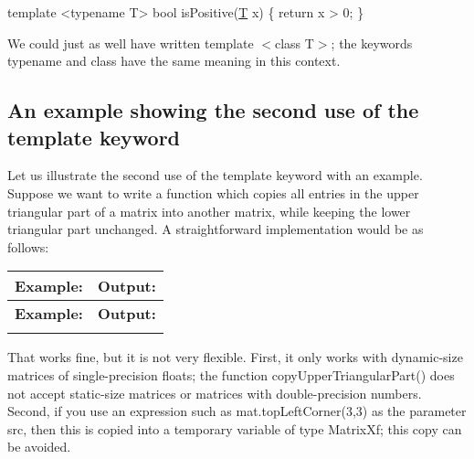 \begin{DoxyCode}
\textcolor{keyword}{template} <\textcolor{keyword}{typename} T>
\textcolor{keywordtype}{bool} isPositive(\hyperlink{group___sparse_core___module_class_eigen_1_1_triplet}{T} x)
\{
    \textcolor{keywordflow}{return} x > 0;
\}
\end{DoxyCode}


We could just as well have written {\ttfamily template $<$class T$>$}; the keywords {\ttfamily typename} and {\ttfamily class} have the same meaning in this context.\hypertarget{_topic_template_keyword_TopicTemplateKeywordExample}{}\subsection{An example showing the second use of the template keyword}\label{_topic_template_keyword_TopicTemplateKeywordExample}
Let us illustrate the second use of the {\ttfamily template} keyword with an example. Suppose we want to write a function which copies all entries in the upper triangular part of a matrix into another matrix, while keeping the lower triangular part unchanged. A straightforward implementation would be as follows\+:

\tabulinesep=1mm
\begin{longtabu} spread 0pt [c]{*{2}{|X[-1]}|}
\hline
\rowcolor{\tableheadbgcolor}\textbf{ Example\+:}&\textbf{ Output\+: }\\
\endfirsthead
\hline
\endfoot
\hline
\rowcolor{\tableheadbgcolor}\textbf{ Example\+:}&\textbf{ Output\+: }\\
\endhead

\begin{DoxyCodeInclude}
\end{DoxyCodeInclude}
  &
\begin{DoxyVerbInclude}
\end{DoxyVerbInclude}
 \\
\end{longtabu}


That works fine, but it is not very flexible. First, it only works with dynamic-\/size matrices of single-\/precision floats; the function {\ttfamily copy\+Upper\+Triangular\+Part()} does not accept static-\/size matrices or matrices with double-\/precision numbers. Second, if you use an expression such as {\ttfamily mat.\+top\+Left\+Corner(3,3)} as the parameter {\ttfamily src}, then this is copied into a temporary variable of type Matrix\+Xf; this copy can be avoided.

